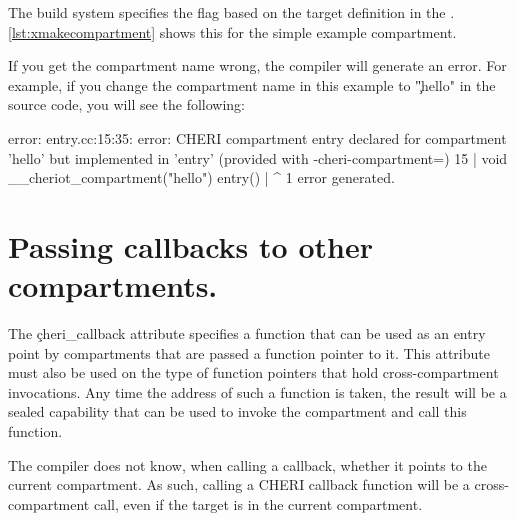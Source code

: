 {{\codelisting[filename=examples/compartment_annotation/compartment.cc,marker=increment,label=lst:incrementfn,caption="The body of a function that is exposed for cross-compartment calls."]{}

The build system specifies the  flag based on the  target definition in the .
\ref{lst:xmakecompartment} shows this for the simple example compartment.

\lualisting[filename=examples/compartment_annotation/xmake.lua,marker=compartment,label=lst:xmakecompartment,caption="Build system code for defining a compartment."]{}

If you get the compartment name wrong, the compiler will generate an error.
For example, if you change the compartment name in this example to \c{"hello"} in the source code, you will see the following:

\begin{console}
error: entry.cc:15:35: error: CHERI compartment entry declared for compartment 'hello' but implemented in 'entry' (provided with -cheri-compartment=)
   15 | void __cheriot_compartment("hello") entry()
      |                                   ^
1 error generated.
\end{console}

\section[label=cheri_callback]{Passing callbacks to other compartments.}

The \c{cheri_callback} attribute specifies a function that can be used as an entry point by compartments that are passed a function pointer to it.
This attribute must also be used on the type of function pointers that hold cross-compartment invocations.
Any time the address of such a function is taken, the result will be a sealed capability that can be used to invoke the compartment and call this function.

\begin{note}
	The compiler does not know, when calling a callback, whether it points to the current compartment.
	As such, calling a CHERI callback function will  be a cross-compartment call, even if the target is in the current compartment.
\end{note}

}}
